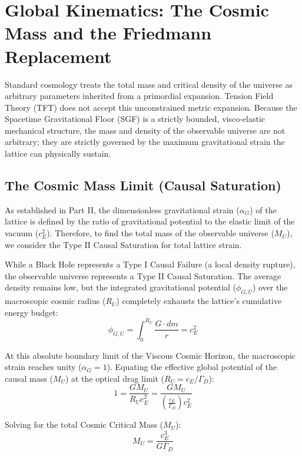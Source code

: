 \chapter{Global Kinematics: The Cosmic Mass and the Friedmann Replacement}
\label{chap:global_kinematics}

Standard cosmology treats the total mass and critical density of the universe as arbitrary parameters inherited from a primordial expansion. Tension Field Theory (TFT) does not accept this unconstrained metric expansion. Because the Spacetime Gravitational Floor (SGF) is a strictly bounded, visco-elastic mechanical structure, the mass and density of the observable universe are not arbitrary; they are strictly governed by the maximum gravitational strain the lattice can physically sustain.

\section{The Cosmic Mass Limit (Causal Saturation)}
As established in Part II, the dimensionless gravitational strain ($\alpha_G$) of the lattice is defined by the ratio of gravitational potential to the elastic limit of the vacuum ($c_E^2$). Therefore, to find the total mass of the observable universe ($M_U$), we consider the Type II Causal Saturation for total lattice strain.

While a Black Hole represents a Type I Causal Failure (a local density rupture), the observable universe represents a Type II Causal Saturation. The average density remains low, but the integrated gravitational potential ($\phi_{G,U}$) over the macroscopic cosmic radius ($R_U$) completely exhausts the lattice's cumulative energy budget:
\begin{equation}
    \phi_{G,U} = \int_0^{R_U} \frac{G \cdot dm}{r} = c_E^2
\end{equation}

At this absolute boundary limit of the Viscous Cosmic Horizon, the macroscopic strain reaches unity ($\alpha_G = 1$). Equating the effective global potential of the causal mass ($M_U$) at the optical drag limit ($R_U = c_E / \Gamma_D$):
\begin{equation}
    1 = \frac{GM_U}{R_U c_E^2} = \frac{GM_U}{\left(\frac{c_E}{\Gamma_D}\right) c_E^2}
\end{equation}

Solving for the total Cosmic Critical Mass ($M_U$):
\begin{equation}
    M_U = \frac{c_E^3}{G \Gamma_D}
\end{equation}

